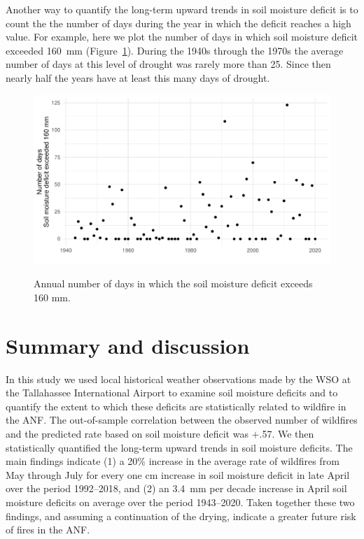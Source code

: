 \documentclass[12pt]{iopart}
\begin{document}
Another way to quantify the long-term upward trends in soil moisture deficit is to count the the number of days during the year in which the deficit reaches a high value. For example, here we plot the number of days in which soil moisture deficit exceeded 160~mm (Figure~\ref{ExceedanceTrend}). During the 1940s through the 1970s the average number of days at this level of drought was rarely more than 25. Since then nearly half the years have at least this many days of drought.
\begin{figure}[t]
\noindent\includegraphics[scale=.8,trim=0in 0in 0in 0in,clip]{ExceedanceTrend.pdf}\\
\vspace{0in}
\caption{Annual number of days in which the soil moisture deficit exceeds 160 mm.}
\label{ExceedanceTrend}
\end{figure}

\section{Summary and discussion}

In this study we used local historical weather observations made by the WSO at the Tallahassee International Airport to examine soil moisture deficits and to quantify the extent to which these deficits are statistically related to wildfire in the ANF. The out-of-sample correlation between the observed number of wildfires and the predicted rate based on soil moisture deficit was $+$.57. We then statistically quantified the long-term upward trends in soil moisture deficits. The main findings indicate (1) a 20\% increase in the average rate of wildfires from May through July for every one cm increase in soil moisture deficit in late April over the period 1992--2018, and (2) an 3.4~mm per decade increase in April soil moisture deficits on average over the period 1943--2020. Taken together these two findings, and assuming a continuation of the drying, indicate a greater future risk of fires in the ANF. 
\end{document}
